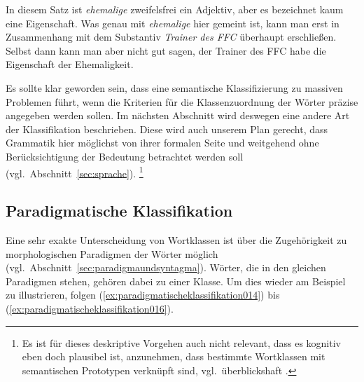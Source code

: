 \begin{exe}
\end{exe}

In diesem Satz ist \textit{ehemalige} zweifelsfrei ein Adjektiv, aber es bezeichnet kaum eine Eigenschaft.
Was genau mit \textit{ehemalige} hier gemeint ist, kann man erst in Zusammenhang mit dem Substantiv \textit{Trainer des FFC} überhaupt erschließen.
Selbst dann kann man aber nicht gut sagen, der Trainer des FFC habe die Eigenschaft der Ehemaligkeit.

Es sollte klar geworden sein, dass eine semantische Klassifizierung zu massiven Problemen führt, wenn die Kriterien für die Klassenzuordnung der Wörter präzise angegeben werden sollen.
Im nächsten Abschnitt wird deswegen eine andere Art der Klassifikation beschrieben.
Diese wird auch unserem Plan gerecht, dass Grammatik hier möglichst von ihrer formalen Seite und weitgehend ohne Berücksichtigung der Bedeutung betrachtet werden soll (vgl.\ Abschnitt~\ref{sec:sprache}).%
\footnote{Es ist für dieses deskriptive Vorgehen auch nicht relevant, dass es kognitiv eben doch plausibel ist, anzunehmen, dass bestimmte Wortklassen mit semantischen Prototypen verknüpft sind, vgl.\ überblickshaft \citet{Croft2001}.}

\subsection{Paradigmatische Klassifikation}
\label{sec:paradigmatischeklassifikation}

Eine sehr exakte Unterscheidung von Wortklassen ist über die Zugehörigkeit zu morphologischen Paradigmen der Wörter möglich (vgl.\ Abschnitt~\ref{sec:paradigmaundsyntagma}).
Wörter, die in den gleichen Paradigmen stehen, gehören dabei zu einer Klasse.
Um dies wieder am Beispiel zu illustrieren, folgen (\ref{ex:paradigmatischeklassifikation014}) bis (\ref{ex:paradigmatischeklassifikation016}).

